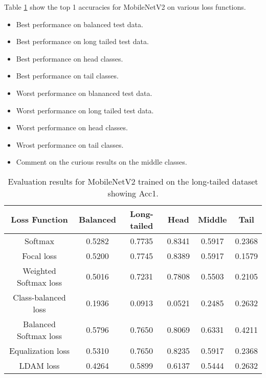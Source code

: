 

% 


Table \ref{tab:mobilenet_lt_acc1_1} show the top 1 accuracies for MobileNetV2 on various loss functions.

\begin{itemize}
    \item Best performance on balanced test data.
    \item Best performance on long tailed test data.
    \item Best performance on head classes.
    \item Best performance on tail classes.
    \item Worst performance on blananced test data.
    \item Worst performance on long tailed test data.
    \item Worst performance on head classes.
    \item Wrost performance on tail classes.
    \item Comment on the curious results on the middle classes.
\end{itemize}

\begin{table}[H]
    \centering
    \begin{tabular}{cccccc}
        \toprule
        Loss Function & Balanced & Long-tailed & Head & Middle & Tail \\ 
        \midrule
        Softmax   & 0.5282   & 0.7735 & 0.8341 & 0.5917 & 0.2368 \\
        Focal loss   & 0.5200   & 0.7745 & 0.8389 & 0.5917 & 0.1579 \\
        Weighted Softmax loss   & 0.5016   & 0.7231 & 0.7808 & 0.5503 & 0.2105 \\
        Class-balanced loss   & 0.1936   & 0.0913 & 0.0521 & 0.2485 & 0.2632 \\
        Balanced Softmax loss   & 0.5796   & 0.7650 & 0.8069 & 0.6331 & 0.4211 \\
        Equalization loss   & 0.5310   & 0.7650 & 0.8235 & 0.5917 & 0.2368 \\
        LDAM loss   & 0.4264 & 0.5899 & 0.6137 & 0.5444 & 0.2632 \\
        \bottomrule
    \end{tabular}
    \caption{Evaluation results for MobileNetV2 trained on the long-tailed dataset showing Acc1.}
    \label{tab:mobilenet_lt_acc1_1}
\end{table}

